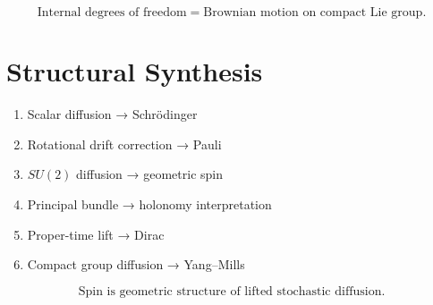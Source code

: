 \documentclass[12pt]{article}
\begin{document}
\[
\text{Internal degrees of freedom}
=
\text{Brownian motion on compact Lie group}.
\]

\section{Structural Synthesis}

\begin{enumerate}
\item Scalar diffusion → Schr\"odinger
\item Rotational drift correction → Pauli
\item $SU(2)$ diffusion → geometric spin
\item Principal bundle → holonomy interpretation
\item Proper-time lift → Dirac
\item Compact group diffusion → Yang–Mills
\end{enumerate}

\[
\boxed{
\text{Spin is geometric structure of lifted stochastic diffusion.}
}
\]
\end{document}

